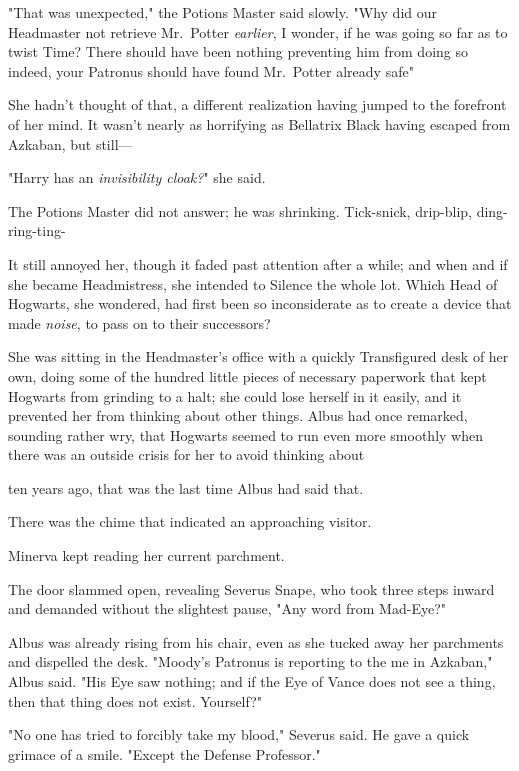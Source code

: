 "That was unexpected," the Potions Master said slowly. "Why did our Headmaster
not retrieve Mr.~Potter \emph{earlier}, I wonder, if he was going so far as to
twist Time? There should have been nothing preventing him from doing so{\el}
indeed, your Patronus should have found Mr.~Potter already safe{\el}"

She hadn't thought of that, a different realization having jumped to the
forefront of her mind. It wasn't nearly as horrifying as Bellatrix Black having
escaped from Azkaban, but still---

"Harry has an \emph{invisibility cloak?}" she said.

The Potions Master did not answer; he was shrinking.
\sbreak
Tick-snick, drip-blip, ding-ring-ting-

It still annoyed her, though it faded past attention after a while; and when
and if she became Headmistress, she intended to Silence the whole lot. Which
Head of Hogwarts, she wondered, had first been so inconsiderate as to create a
device that made \emph{noise}, to pass on to their successors?

She was sitting in the Headmaster's office with a quickly Transfigured desk of
her own, doing some of the hundred little pieces of necessary paperwork that
kept Hogwarts from grinding to a halt; she could lose herself in it easily, and
it prevented her from thinking about other things. Albus had once remarked,
sounding rather wry, that Hogwarts seemed to run even more smoothly when there
was an outside crisis for her to avoid thinking about{\el}

{\el} ten years ago, that was the last time Albus had said that.

There was the chime that indicated an approaching visitor.

Minerva kept reading her current parchment.

The door slammed open, revealing Severus Snape, who took three steps inward and
demanded without the slightest pause, "Any word from Mad-Eye?"

Albus was already rising from his chair, even as she tucked away her parchments
and dispelled the desk. "Moody's Patronus is reporting to the me in Azkaban,"
Albus said. "His Eye saw nothing; and if the Eye of Vance does not see a thing,
then that thing does not exist. Yourself?"

"No one has tried to forcibly take my blood," Severus said. He gave a quick
grimace of a smile. "Except the Defense Professor."

